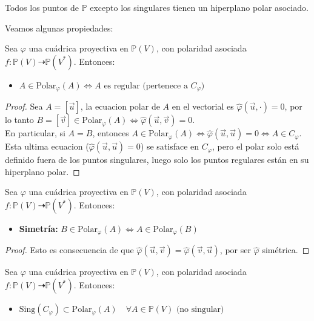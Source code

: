 \begin{observación}
    Todos los puntos de $\mathbb{P}$ excepto los singulares tienen un hiperplano polar asociado.
\end{observación}

Veamos algunas propiedades:

\begin{proposición}
    Sea $\varphi$ una cuádrica proyectiva en $\mathbb{P}(V)$, con polaridad asociada $f : \mathbb{P}(V) \dashrightarrow \mathbb{P}(V^*)$. Entonces:
    \begin{itemize}
        \item $A \in \text{Polar}_\varphi(A) \iff A \text{ es regular (pertenece a } C_{\varphi} \text{)}$
    \end{itemize}
\end{proposición}

\begin{proof}
    Sea $A=[\vec{u}]$, la ecuacion polar de $A$ en el vectorial es $\hat{\varphi}(\vec{u}, \cdot) = 0$, por lo tanto $B=[\vec{v}] \in \text{Polar}_\varphi(A) \iff \hat{\varphi}(\vec{u}, \vec{v}) = 0$.\\ 
    En particular, si $A = B$, entonces $A \in \text{Polar}_\varphi(A) \iff \hat{\varphi}(\vec{u}, \vec{u}) = 0 \iff A \in C_{\varphi}$.\\
    Esta ultima ecuacion ($\hat{\varphi}(\vec{u}, \vec{u}) = 0$) se satisface en $C_{\varphi}$, pero el polar solo está definido fuera de los puntos singulares, luego solo los puntos regulares están en su hiperplano polar.
\end{proof}

\begin{proposición}
    Sea $\varphi$ una cuádrica proyectiva en $\mathbb{P}(V)$, con polaridad asociada $f : \mathbb{P}(V) \dashrightarrow \mathbb{P}(V^*)$. Entonces:
    \begin{itemize}
        \item \textbf{Simetría: } $B \in \text{Polar}_\varphi(A) \iff A \in \text{Polar}_\varphi(B)$
    \end{itemize}
\end{proposición}

\begin{proof}
    Esto es consecuencia de que $\hat{\varphi}(\vec{u}, \vec{v}) = \hat{\varphi}(\vec{v}, \vec{u})$, por ser $\hat{\varphi}$ simétrica.
\end{proof}

\begin{proposición}
    Sea $\varphi$ una cuádrica proyectiva en $\mathbb{P}(V)$, con polaridad asociada $f : \mathbb{P}(V) \dashrightarrow \mathbb{P}(V^*)$. Entonces:
    \begin{itemize}
        \item $\text{Sing} (C_{\varphi}) \subset \text{Polar}_\varphi(A) \quad \forall A \in \mathbb{P}(V) \text{ (no singular)}$
    \end{itemize}
\end{proposición}

